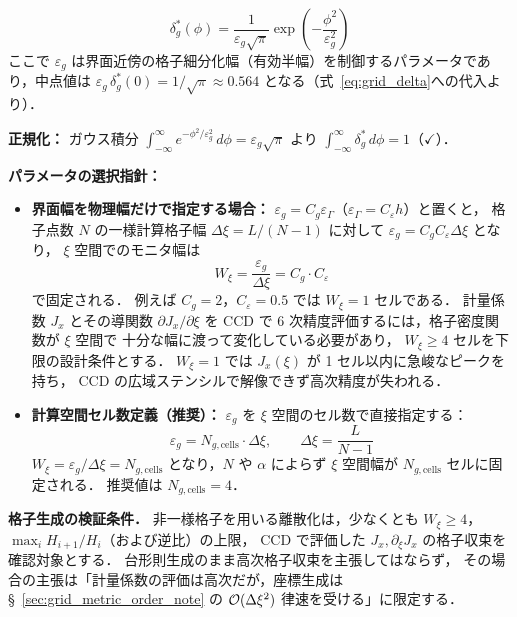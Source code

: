 \begin{equation}
  \delta_g^*(\phi) =
  \frac{1}{\varepsilon_g\sqrt{\pi}}\exp\!\left(-\frac{\phi^2}{\varepsilon_g^2}\right)
  \label{eq:grid_delta}
\end{equation}
ここで $\varepsilon_g$ は界面近傍の格子細分化幅（有効半幅）を制御するパラメータであり，中点値は $\varepsilon_g\,\delta_g^*(0) = 1/\sqrt{\pi} \approx 0.564$ となる（式~\eqref{eq:grid_delta}への代入より）．

\textbf{正規化：} ガウス積分 $\int_{-\infty}^\infty e^{-\phi^2/\varepsilon_g^2}\,d\phi = \varepsilon_g\sqrt{\pi}$ より $\int_{-\infty}^\infty \delta_g^*\,d\phi = 1$（$\checkmark$）．

\textbf{パラメータの選択指針：}
\begin{itemize}
  \item \textbf{界面幅を物理幅だけで指定する場合：}
        $\varepsilon_g = C_{g} \varepsilon_\Gamma$（$\varepsilon_\Gamma = C_\varepsilon h$）と置くと，
        格子点数 $N$ の一様計算格子幅 $\Delta\xi=L/(N-1)$ に対して
        $\varepsilon_g = C_g C_\varepsilon \Delta\xi$ となり，
        $\xi$ 空間でのモニタ幅は
        \[
          W_\xi = \frac{\varepsilon_g}{\Delta\xi} = C_{g} \cdot C_\varepsilon
        \]
        で固定される．
        例えば $C_{g} = 2$，$C_\varepsilon = 0.5$ では $W_\xi = 1$ セルである．
        計量係数 $J_x$ とその導関数 $\partial J_x/\partial\xi$ を CCD で
        6 次精度評価するには，格子密度関数が $\xi$ 空間で
        十分な幅に渡って変化している必要があり，
        $W_\xi \ge 4$ セルを下限の設計条件とする．
        $W_\xi = 1$ では $J_x(\xi)$ が 1 セル以内に急峻なピークを持ち，
        CCD の広域ステンシルで解像できず高次精度が失われる．
  \item \textbf{計算空間セル数定義（推奨）：}
        $\varepsilon_g$ を $\xi$ 空間のセル数で直接指定する：
        \begin{equation}
          \varepsilon_g = N_{g,\text{cells}} \cdot \Delta\xi,
          \qquad \Delta\xi = \frac{L}{N-1}
          \label{eq:eps_g_xi}
        \end{equation}
	        $W_\xi = \varepsilon_g/\Delta\xi = N_{g,\text{cells}}$ となり，$N$ や $\alpha$ によらず
	        $\xi$ 空間幅が $N_{g,\text{cells}}$ セルに固定される．
	        推奨値は $N_{g,\text{cells}} = 4$．
\end{itemize}

\noindent\textbf{格子生成の検証条件．}
非一様格子を用いる離散化は，少なくとも
$W_\xi\ge4$，
$\max_i H_{i+1}/H_i$（および逆比）の上限，
CCD で評価した $J_x,\partial_\xi J_x$ の格子収束を確認対象とする．
台形則生成のまま高次格子収束を主張してはならず，
その場合の主張は「計量係数の評価は高次だが，座標生成は
§~\ref{sec:grid_metric_order_note} の $\mathcal{O}(\Delta\xi^2)$ 律速を受ける」に限定する．

